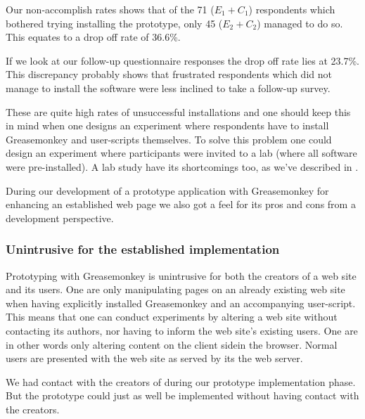 Our non-accomplish rates%
shows that of the 71 ($E_1 + C_1$) respondents which bothered trying
installing the prototype, only 45 ($E_2 + C_2$) managed to do so. This equates
to a drop off rate of 36.6\%.

If we look at our follow-up questionnaire responses%
the drop off rate lies at 23.7\%. This discrepancy probably shows that
frustrated respondents which did not manage to install the software were less
inclined to take a follow-up survey.

These are quite high rates of unsuccessful
installations and one should keep this in mind when one designs an
experiment where respondents have to install Greasemonkey and user-scripts
themselves. To solve this problem one could design an experiment where
participants were invited to a lab (where all software were pre-installed). A
lab study have its shortcomings too, as we've described in
.

\parabreak

During our development of a prototype application with Greasemonkey for
enhancing an established web page we also got a feel for its pros and cons
from a development perspective.

\subsubsection{Unintrusive for the established implementation}

Prototyping with Greasemonkey is unintrusive for both the creators
of a web site and its users.  One are only manipulating
pages on an already existing web site when having explicitly installed
Greasemonkey and an accompanying user-script. This means that one can
conduct experiments by altering a web site without contacting its authors,
nor having to inform the web site's existing users. One are in other words
only altering content on the client side\dash{}in the browser. Normal users
are presented with the web site as served by its the web server.

We had contact with the creators of \urort{} during our prototype
implementation phase. But the prototype could just as well be implemented
without having contact with the creators.%

